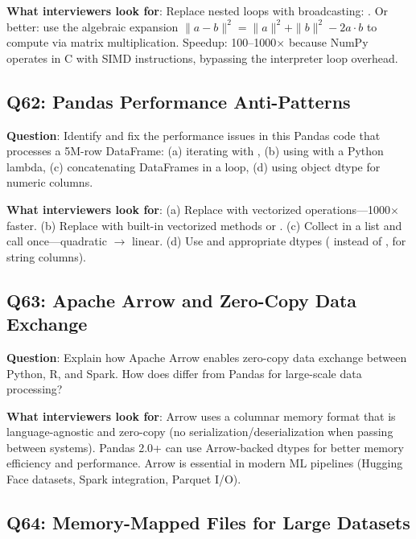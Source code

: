 \textbf{What interviewers look for}: Replace nested loops with broadcasting: . Or better: use the algebraic expansion $\|a-b\|^2 = \|a\|^2 + \|b\|^2 - 2a \cdot b$ to compute via matrix multiplication. Speedup: 100--1000$\times$ because NumPy operates in C with SIMD instructions, bypassing the interpreter loop overhead.

\subsection{Q62: Pandas Performance Anti-Patterns}

\textbf{Question}: Identify and fix the performance issues in this Pandas code that processes a 5M-row DataFrame: (a) iterating with , (b) using  with a Python lambda, (c) concatenating DataFrames in a loop, (d) using object dtype for numeric columns.

\textbf{What interviewers look for}: (a) Replace  with vectorized operations---1000$\times$ faster. (b) Replace  with built-in vectorized methods or . (c) Collect in a list and call  once---quadratic $\to$ linear. (d) Use  and appropriate dtypes ( instead of ,  for string columns).

\subsection{Q63: Apache Arrow and Zero-Copy Data Exchange}

\textbf{Question}: Explain how Apache Arrow enables zero-copy data exchange between Python, R, and Spark. How does  differ from Pandas for large-scale data processing?

\textbf{What interviewers look for}: Arrow uses a columnar memory format that is language-agnostic and zero-copy (no serialization/deserialization when passing between systems). Pandas 2.0+ can use Arrow-backed dtypes for better memory efficiency and performance. Arrow is essential in modern ML pipelines (Hugging Face datasets, Spark integration, Parquet I/O).

\subsection{Q64: Memory-Mapped Files for Large Datasets}

